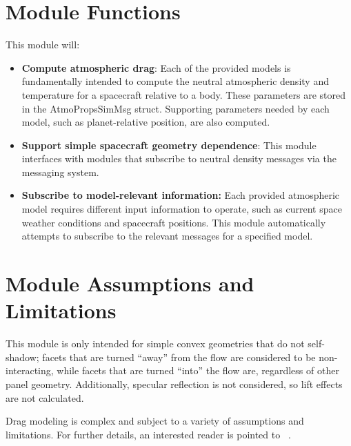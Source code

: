 

\section{Module Functions}
This module will:
\begin{itemize}
	\item \textbf{Compute atmospheric drag}: Each of the provided models is fundamentally intended to compute the neutral atmospheric density and temperature for a spacecraft relative to a body. These parameters are stored in the AtmoPropsSimMsg struct. Supporting parameters needed by each model, such as planet-relative position, are also computed.
	\item \textbf{Support simple spacecraft geometry dependence}: This module interfaces with modules that subscribe to neutral density messages via the messaging system.
	\item \textbf {Subscribe to model-relevant information:} Each provided atmospheric model requires different input information to operate, such as current space weather conditions and spacecraft positions. This module automatically attempts to subscribe to the relevant messages for a specified model. \end{itemize}

\section{Module Assumptions and Limitations}
This module is only intended for simple convex geometries that do not self-shadow; facets that are turned ``away'' from the flow are considered to be non-interacting, while facets that are turned ``into'' the flow are, regardless of other panel geometry. Additionally, specular reflection is not considered, so lift effects are not calculated. 

Drag modeling is complex and subject to a variety of assumptions and limitations. For further details, an interested reader is pointed to ~. 